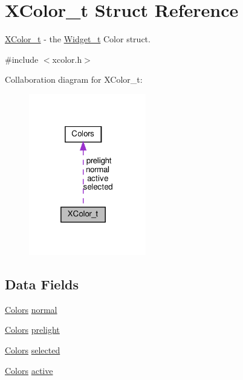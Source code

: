 \hypertarget{structXColor__t}{}\section{X\+Color\+\_\+t Struct Reference}
\label{structXColor__t}


\hyperlink{structXColor__t}{X\+Color\+\_\+t} -\/ the \hyperlink{structWidget__t}{Widget\+\_\+t} Color struct.  




{\ttfamily \#include $<$xcolor.\+h$>$}



Collaboration diagram for X\+Color\+\_\+t\+:
\nopagebreak
\begin{figure}[H]
\begin{center}
\leavevmode
\includegraphics[width=145pt]{structXColor__t__coll__graph}
\end{center}
\end{figure}
\subsection*{Data Fields}
\begin{DoxyCompactItemize}
\item 
\hyperlink{structColors}{Colors} \hyperlink{structXColor__t_a56d55140d2797460ac1d0253163d6f66}{normal}
\item 
\hyperlink{structColors}{Colors} \hyperlink{structXColor__t_ac1bfe871ca6e4d1926b902b38f70d649}{prelight}
\item 
\hyperlink{structColors}{Colors} \hyperlink{structXColor__t_a7fc75aa694046d6e72ecb206e9188401}{selected}
\item 
\hyperlink{structColors}{Colors} \hyperlink{structXColor__t_aa4d279f22b0e56d8b590a0beb34101e4}{active}
\end{DoxyCompactItemize}



